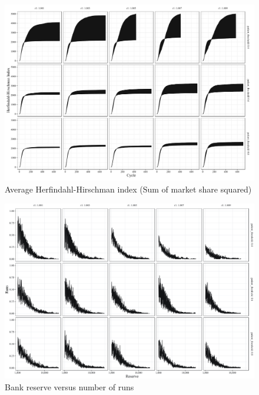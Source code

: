 \setcounter{figure}{6}

\begin{frame}[plain]
    \begin{figure}
        \centering
        \includegraphics[width=\textwidth]{fig/fig7.jpeg}
        \caption{Average Herfindahl-Hirschman index (Sum of market share squared)}
        \label{fig:num_run}
    \end{figure}
\end{frame}


\begin{frame}[plain]
    \begin{figure}
        \centering
        \includegraphics[width=\textwidth]{fig/fig8.jpeg}
        \caption{Bank reserve versus number of runs}
        \label{fig:num_run}
    \end{figure}
\end{frame}